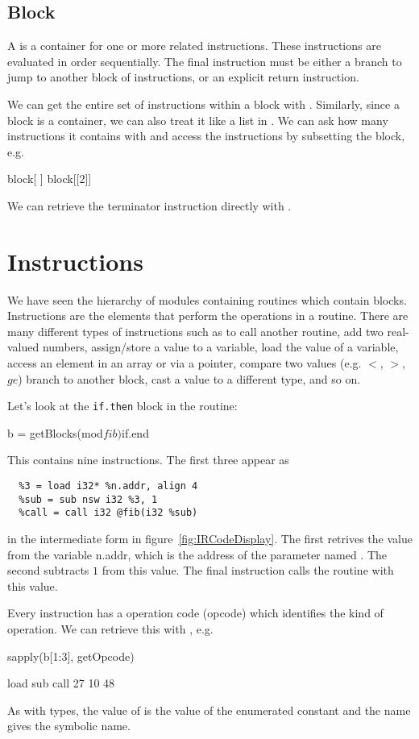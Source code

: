 \documentclass[article]{jss}
\begin{document}
\subsection{Block}
A  is a container for one or more related instructions.
These instructions are evaluated in order sequentially.  The final
instruction must be either a branch to jump to another block of
instructions, or an explicit return instruction.

We can get the entire set of instructions within  a block
with .
Similarly, since a block is a container, we can also treat it like a list in \R.  We
can ask how many instructions it contains with  and
access the instructions by subsetting the block, e.g.
\begin{RCode}
 block[ ]  
 block[[2]]
\end{RCode}

We can retrieve the terminator instruction directly with
.

\section{Instructions}
We have seen the hierarchy of modules containing routines which
contain blocks.  Instructions are the elements that perform the
operations in a routine.  There are many different types of
instructions such as to call another routine,
add two real-valued numbers, assign/store
a value to a variable, load the value of a variable,
access an element in an array or via a pointer,
compare two values (e.g. $<$, $>$, $ge$)
branch to another block, cast a value to a different type, and so on.

Let's look at the \texttt{if.then} block in the
 routine:
\begin{RCode}
b = getBlocks(mod$fib)$if.end
\end{RCode}
This contains nine instructions.
The first three appear as 
\begin{Verbatim}
  %3 = load i32* %n.addr, align 4
  %sub = sub nsw i32 %3, 1
  %call = call i32 @fib(i32 %sub)  
\end{Verbatim}
in the intermediate form in figure~\ref{fig:IRCodeDisplay}.
The first retrives the value from the variable n.addr, which 
is the address of the parameter named .
The second subtracts $1$ from this value.
The final instruction calls the  routine with this value.

Every instruction has a operation code (opcode) which identifies
the kind of operation. We can retrieve this with ,
e.g.
\begin{RCode}
sapply(b[1:3], getOpcode)
\end{RCode}
\begin{ROutput}
load  sub call 
  27   10   48   
\end{ROutput}
As with types, the value of  is the value of the
\C{} enumerated constant and the name gives the symbolic name.
\end{document}
